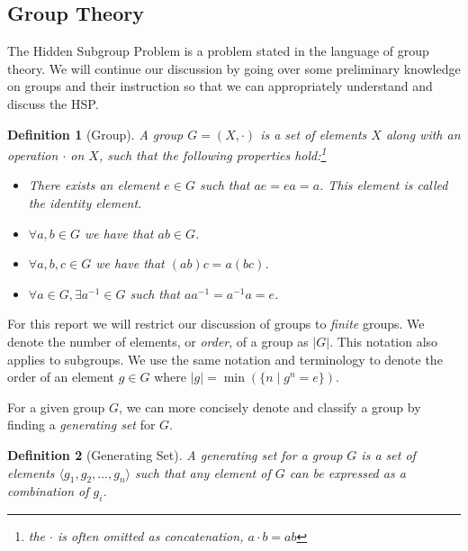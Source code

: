 \documentclass{article}
\theoremstyle{plain}
\theoremstyle{centered}
\newtheorem{definition}{Definition}
\newcommand{\camelia}{{\color{red}comment: }}
\newcommand{\abs}[1]{\left\lvert #1 \right\rvert}
\begin{document}
    \subsection{Group Theory}\label{history:group_theory}
        
        The Hidden Subgroup Problem is a problem stated in the language of group theory. We will continue our discussion by going over some preliminary knowledge on groups and their instruction so that we can appropriately understand and discuss the HSP.

        \begin{definition}[Group]\label{def:group}
                A \textit{group} $G = (X, \cdot)$ is a set of elements $X$ along with an operation $\cdot$ on $X$,  such that the following properties hold:\footnote{the $\cdot $ is often omitted as concatenation, $a \cdot b = ab$
                }
                \begin{itemize}
                \item There exists an element $ e \in G$ such that $ae = ea = a$. This element is called the \textit{identity} element.
                \item $\forall a, b \in G$ we have that $ab \in G$.

                
                \item $\forall a, b, c \in G$ we have that $(ab)c = a(bc)$.
                \item $\forall a \in G, \exists a^{-1} \in G$ such that $aa^{-1} = a^{-1} a = e$.
                \end{itemize}
        \end{definition}
        For this report we will restrict our discussion of groups to \textit{finite} groups.
        We denote the number of elements, or \textit{order}, of a group as $\abs{G}$.
        This notation also applies to subgroups.
        We use the same notation and terminology to denote the order of an element $g \in G$ where $\abs{g} = \min(\{n \mid g^n = e\})$.


        For a given group $G$, we can more concisely denote and classify a group by finding a \textit{generating set} for $G$.
        \begin{definition}[Generating Set]
                A \textit{generating set} for a group $G$ is a set of elements $\langle g_1, g_2, \dots, g_n \rangle$ such that any element of $G$ can be expressed as a combination of $g_i$.
        \end{definition}
\end{document}
